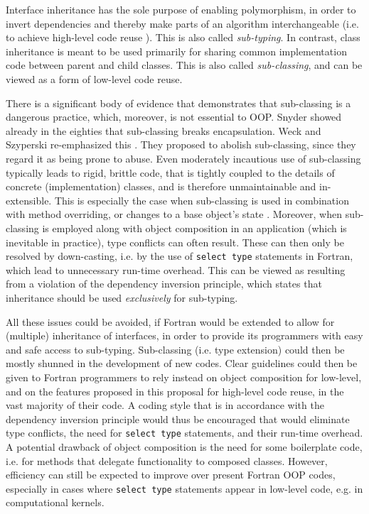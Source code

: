 \documentclass[11pt,oneside]{article}
\begin{document}
Interface inheritance has the sole purpose of enabling polymorphism,
in order to invert dependencies and thereby make parts of an algorithm
interchangeable (i.e. to achieve high-level code reuse
\cite{Gamma_et_al_94}). This is also called \emph{sub-typing}. In
contrast, class inheritance is meant to be used primarily for sharing
common implementation code between parent and child classes. This is
also called \emph{sub-classing}, and can be viewed as a form of
low-level code reuse.

There is a significant body of evidence that demonstrates that
sub-classing is a dangerous practice, which, moreover, is not
essential to OOP. Snyder \cite{Snyder86} showed already in the
eighties that sub-classing breaks encapsulation. Weck and Szyperski
re-emphasized this \cite{Weck_Szyperski}. They proposed to abolish
sub-classing, since they regard it as being prone to abuse. Even
moderately incautious use of sub-classing typically leads to rigid,
brittle code, that is tightly coupled to the details of concrete
(implementation) classes, and is therefore unmaintainable and
in-extensible. This is especially the case when sub-classing is used in
combination with method overriding, or changes to a base object's
state \cite{Weck_Szyperski}. Moreover, when sub-classing is employed
along with object composition in an application (which is inevitable
in practice), type conflicts can often result. These can then only be
resolved by down-casting, i.e. by the use of \texttt{select type}
statements in Fortran, which lead to unnecessary run-time
overhead. This can be viewed as resulting from a violation of the
dependency inversion principle, which states that inheritance should
be used \emph{exclusively} for sub-typing.

All these issues could be avoided, if Fortran would be extended to
allow for (multiple) inheritance of interfaces, in order to provide
its programmers with easy and safe access to sub-typing. Sub-classing
(i.e. type extension) could then be mostly shunned in the development
of new codes. Clear guidelines could then be given to Fortran
programmers to rely instead on object composition for low-level, and
on the features proposed in this proposal for high-level code reuse,
in the vast majority of their code. A coding style that is in
accordance with the dependency inversion principle would thus be
encouraged that would eliminate type conflicts, the need for
\texttt{select type} statements, and their run-time overhead. A
potential drawback of object composition is the need for some
boilerplate code, i.e. for methods that delegate functionality to
composed classes. However, efficiency can still be expected to improve
over present Fortran OOP codes, especially in cases where
\texttt{select type} statements appear in low-level code, e.g. in
computational kernels.
\end{document}

